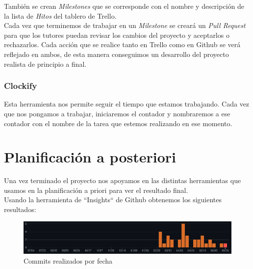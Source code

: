 También se crean \textit{Milestones} que se corresponde con el nombre y descripción de la lista de \textit{Hitos} del tablero de Trello.\\

Cada vez que terminemos de trabajar en un \textit{Milestone} se creará un \textit{Pull Request} para que los tutores puedan revisar los cambios del proyecto y aceptarlos o rechazarlos. Cada acción que se realice tanto en Trello como en Github se verá reflejado en ambos, de esta manera conseguimos un desarrollo del proyecto realista de principio a final.

\subsubsection{Clockify}

Esta herramienta nos permite seguir el tiempo que estamos trabajando. Cada vez que nos pongamos a trabajar, iniciaremos el contador y nombraremos a ese contador con el nombre de la tarea que estemos realizando en ese momento.






\section{Planificación a posteriori}

Una vez terminado el proyecto nos apoyamos en las distintas herramientas que usamos en la planificación a priori para ver el resultado final. \\

Usando la herramienta de ``Insights`` de Github obtenemos los siguientes resultados:


\begin{figure}[hb!]
    \centering
    \includegraphics[width=\linewidth]{imagenes/commits.png}
    \caption{Commits realizados por fecha}
    \label{fig:figure4-plan}
\end{figure}

